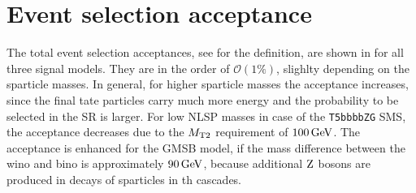 \section*{Event selection acceptance}
The total event selection acceptances, see  for the definition, are shown in  for all three signal models. They are in the order of $\mathcal{O}(1\%)$, slighlty depending on the sparticle masses. In general, for higher sparticle masses the acceptance increases, since the final tate particles carry much more energy and the probability to be selected in the SR is larger. For low NLSP masses in case of the \texttt{T5bbbbZG} SMS, the acceptance decreases due to the $M_{\mathrm{T2}}$ requirement of $100\,\text{Ge\hspace{-.08em}V}$. The acceptance is enhanced for the GMSB model, if the mass difference between the wino and bino is approximately $90\,\text{Ge\hspace{-.08em}V}$, because additional $\mathrm{Z}$ bosons are produced in decays of sparticles in th cascades.
